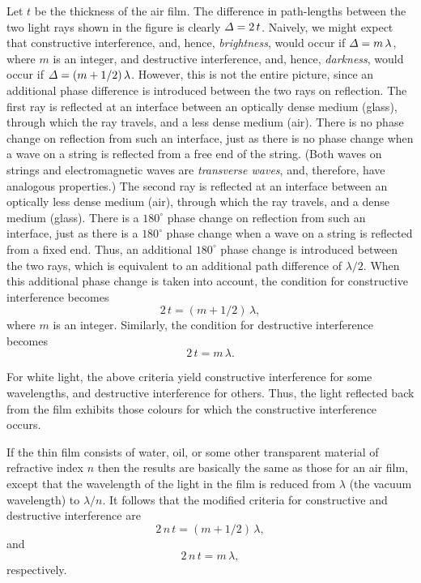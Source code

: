 Let $t$ be the thickness of the air film. The difference in path-lengths
between the two light rays shown in the figure is clearly ${\mit\Delta}=2\,t$.
Naively, we might expect that constructive interference, and, hence,
 {\em brightness},
would  occur if ${\mit \Delta}=m\,\lambda$, where $m$ is an integer,
and destructive interference, and, hence, {\em  darkness}, would occur if
${\mit\Delta}=(m+1/2)\,\lambda$. However, this is not the
entire picture, since an additional phase difference is introduced between
the two rays on reflection. The first ray is reflected at an interface
between an optically dense medium (glass), through which the
ray travels,  and a less dense medium (air).
There is no phase change on reflection from such an interface, just
as there is no phase change when a wave on a string is reflected from a
free end of the string. (Both waves on strings and electromagnetic
waves are {\em transverse waves}, and, therefore, have analogous
properties.)
The second ray is reflected at an interface
between an optically less dense medium (air),  through which the
ray travels,  and a  dense medium (glass). There is a
$180^\circ$ phase change on reflection from such an interface, just as
there is a $180^\circ$ phase change when a wave on a string
is reflected from a fixed end. Thus, an additional $180^\circ$ phase change
is introduced between the two rays, which is equivalent to an
additional path difference of $\lambda/2$. When this additional
phase change is taken into account, the condition for constructive
interference becomes 
\begin{equation}
2\,t=(m+1/2)\,\lambda,
\end{equation}
where $m$ is an integer. Similarly, the condition for
destructive interference becomes
\begin{equation}
2\,t = m\,\lambda.
\end{equation}

For white light, the above criteria yield constructive interference for
some wavelengths, and destructive interference for others. Thus,
the light reflected back from the film exhibits those colours
for which the constructive interference occurs.

If the thin film consists of water, oil, or some other transparent material
of refractive index $n$ then the results are basically the same as those for
an air film, except that the wavelength of the light in the
film is reduced from $\lambda$ (the vacuum wavelength) to $\lambda/n$.
It follows that the modified  criteria for constructive and destructive
interference are
\begin{equation}
2\,n\,t=(m+1/2)\,\lambda,
\end{equation}
and
\begin{equation}
2\,n\,t = m\,\lambda,
\end{equation}
respectively.

